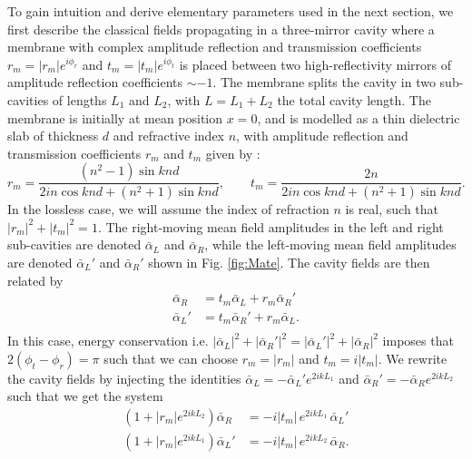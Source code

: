 To gain intuition and derive elementary parameters used in the next section, we first describe the classical fields propagating in a three-mirror cavity where a membrane with complex amplitude reflection and transmission coefficients \(r_m=|r_m|e^{i\phi_r}\) and \(t_m=|t_m|e^{i\phi_t}\) is placed between two high-reflectivity mirrors of amplitude reflection coefficients \( \sim -1 \). The membrane splits the cavity in two sub-cavities of lengths \(L_1\) and \(L_2\), with \(L=L_1+L_2\) the total cavity length. The membrane is initially at mean position $x=0$, and is modelled as a thin dielectric slab of thickness \(d\) and refractive index \(n\), with amplitude reflection and transmission coefficients \(r_m\) and \(t_m\) given by \cite{Thompson2008Nature, jayich_dispersive_2008}:
\begin{equation}
r_m = \frac{(n^2-1)\sin k n d}{2 i n \cos k n d  + (n^2+1)\sin k n d}, \qquad t_m = \frac{2 n}{2 i n \cos k n d  + (n^2+1)\sin k n d}. 
\label{eq:membrane_rt}
\end{equation}
In the lossless case, we will assume the index of refraction $n$ is real, such that \(|r_m|^2 + |t_m|^2 = 1\). The right-moving mean field amplitudes in the left and right sub-cavities are denoted \(\bar \alpha_L\) and \(\bar \alpha_R\), while the left-moving mean field amplitudes are denoted \(\bar \alpha_L'\) and \(\bar \alpha_R'\) shown in Fig. \ref{fig:Mate}. The cavity fields are then related by 
\begin{equation}
\begin{split}
\bar \alpha_R  &= t_m \bar \alpha_L + r_m \bar \alpha_R' \\
\bar \alpha_L' &= t_m \bar \alpha_R'+ r_m \bar \alpha_L. \\
\end{split}
\end{equation}
In this case, energy conservation i.e. $|\bar \alpha_L|^2 + |\bar \alpha_R'|^2 = |\bar \alpha_L'|^2 + |\bar \alpha_R|^2$ imposes that $2(\phi_t-\phi_r) = \pi$ such that we can choose $r_m = |r_m|$ and $t_m = i|t_m|$. We rewrite the cavity fields by injecting the identities $\bar \alpha_L = - \bar \alpha_L' e^{2ikL_1}$ and $\bar \alpha_R' = - \bar \alpha_R e^{2ikL_2}$ such that we get the system 
\begin{equation}
\begin{split}
  (1+ |r_m| e^{2ikL_2}) \bar \alpha_R & = -i |t_m| \, e^{2ikL_1}  \, \bar \alpha_L'\\
  (1+ |r_m| e^{2ikL_1}) \bar \alpha_L' & = -i |t_m| \, e^{2ikL_2} \,  \bar \alpha_R. 
  \label{eq:cavity_fields_system}
    \end{split}
\end{equation}

